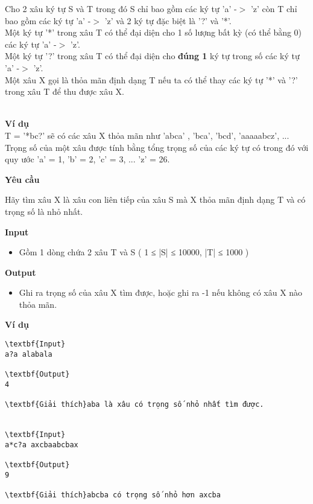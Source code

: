 

Cho 2 xâu ký tự S và T trong đó S chỉ bao gồm các ký tự 'a' -$>$ 'z' còn T chỉ bao gồm các ký tự 'a' -$>$ 'z' và 2 ký tự đặc biệt là '?' và '*'.
\\Một ký tự '*' trong xâu T có thể đại diện cho 1 số lượng bất kỳ (có thể bằng 0) các ký tự 'a' -$>$ 'z'.
\\Một ký tự '?' trong xâu T có thể đại diện cho \textbf{ đúng 1 } ký tự trong số các ký tự 'a' -$>$ 'z'.
\\Một xâu X gọi là thỏa mãn định dạng T nếu ta có thể thay các ký tự '*' và '?' trong xâu T để thu được xâu X.


\\\textbf{Ví dụ}
\\T = '*bc?' sẽ có các xâu X thỏa mãn như 'abca' , 'bca', 'bcd', 'aaaaabcz', ...
\\Trọng số của một xâu được tính bằng tổng trọng số của các ký tự có trong đó với quy ước 'a' = 1, 'b' = 2, 'c' = 3, ... 'z' = 26.

\textbf{Yêu cầu}

Hãy tìm xâu X là xâu con liên tiếp của xâu S mà X thỏa mãn định dạng T và có trọng số là nhỏ nhất.

\textbf{Input }
\begin{itemize}
	\item 

Gồm 1 dòng chứa 2 xâu T và S ( 1 ≤ |S| ≤ 10000, |T| ≤ 1000 )
\end{itemize}

\textbf{Output }
\begin{itemize}
	\item 

Ghi ra trọng số của xâu X tìm được, hoặc ghi ra -1 nếu không có xâu X nào thỏa mãn.
\end{itemize}

\textbf{Ví dụ}
\begin{verbatim}
\textbf{Input}
a?a alabala

\textbf{Output}
4

\textbf{Giải thích}aba là xâu có trọng số nhỏ nhất tìm được.


\textbf{Input}
a*c?a axcbaabcbax

\textbf{Output}
9

\textbf{Giải thích}abcba có trọng số nhỏ hơn axcba\end{verbatim}
